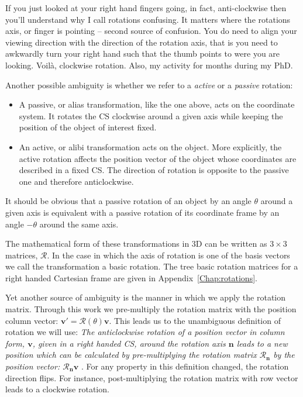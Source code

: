 If you just looked at your right hand fingers going, in fact, anti-clockwise then you'll understand why I call rotations confusing. It matters where the rotations axis, or finger is pointing -- second source of confusion. You do need to align your viewing direction with the direction of the rotation axis, that is you need to awkwardly turn your right hand such that the thumb points to were you are looking. Voil\`{a}, clockwise rotation. Also, my activity for months during my PhD. 

Another possible ambiguity is whether we refer to a \textit{active} or a \textit{passive} rotation:
\begin{itemize}
\item A passive, or alias transformation, like the one above, acts on the coordinate system. It rotates the CS clockwise around a given axis while keeping the position of the object of interest fixed.
\item An active, or alibi transformation acts on the object. More explicitly, the active rotation affects the position vector of the object whose coordinates are described in a fixed CS. The direction of rotation is opposite to the passive one and therefore anticlockwise.
\end{itemize}
It should be obvious that a passive rotation of an object by an angle $\theta$ around a given axis is equivalent with a passive rotation of its coordinate frame by an angle $-\theta$ around the same axis.

The mathematical form of these transformations in 3D can be written as $3\times 3$ matrices, $\mathcal{R}$. In the case in which the axis of rotation is one of the basis vectors we call the transformation a basic rotation. The tree basic rotation matrices for a right handed Cartesian frame are given in Appendix~\ref{Chap:rotations}. 

Yet another source of ambiguity is the manner in which we apply the rotation matrix. Through this work we pre-multiply the rotation matrix with the position column vector: $\mathbf{v'}=\mathcal{R}(\theta)\mathbf{v}$. This leads us to the unambiguous definition of rotation we will use: \textit{The anticlockwise rotation of a position vector in column form, $\mathbf{v}$, given in a right handed CS, around the rotation axis $\mathbf{n}$ leads to a new position which can be calculated by pre-multiplying the rotation matrix $\mathcal{R_{\mathbf{n}}}$ by the position vector: $\mathcal{R_{\mathbf{n}}} \mathbf{v}$ }. For any property in this definition changed, the rotation direction flips. For instance, post-multiplying the rotation matrix with row vector leads to a clockwise rotation. 

